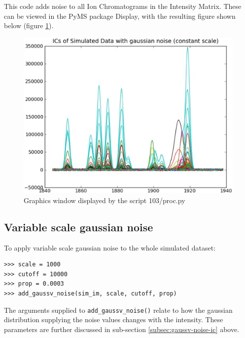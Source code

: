 This code adds noise to all Ion Chromatograms in the Intensity Matrix. These can be 
viewed in the PyMS package Display, with the resulting figure shown below (figure 
\ref{fig:gaussc-noise}).



\begin{figure}[h]
  \begin{center}
    \includegraphics[scale=0.25]{graphics/chapter09/test-93.eps}
  \end{center}
  \caption{Graphics window displayed by the script 103/proc.py}
  \label{fig:gaussc-noise}
\end{figure}


\subsection{Variable scale gaussian noise}
\label{subsec:gaussv-noise}

To apply variable scale gaussian noise to the whole simulated dataset:

\begin{verbatim}
>>> scale = 1000
>>> cutoff = 10000
>>> prop = 0.0003
>>> add_gaussv_noise(sim_im, scale, cutoff, prop)
\end{verbatim}

The arguments supplied to {\tt add\_gaussv\_noise()} relate to how the gaussian distribution
supplying the noise values changes with the intensity. These parameters are further discussed in 
sub-section \ref{subsec:gaussv-noise-ic} above.

